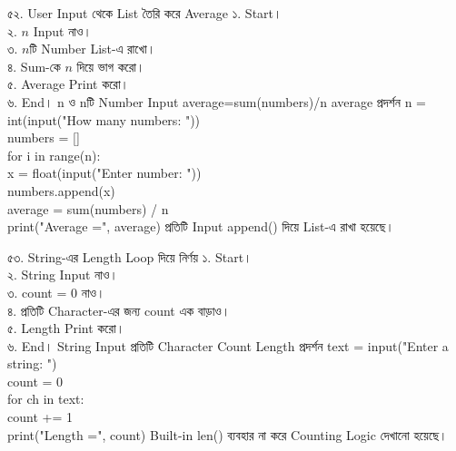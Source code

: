 
\exerciseTable
{৫২. User Input থেকে List তৈরি করে Average}
{
১. Start।\\
২. \(n\) Input নাও।\\
৩. \(n\)টি Number List-এ রাখো।\\
৪. Sum-কে \(n\) দিয়ে ভাগ করো।\\
৫. Average Print করো।\\
৬. End।
}
{
\linearflow
{n ও nটি Number Input}
{average=sum(numbers)/n}
{average প্রদর্শন}
}
{
n = int(input("How many numbers: "))\\
numbers = []\\
for i in range(n):\\
\hspace*{4mm}x = float(input("Enter number: "))\\
\hspace*{4mm}numbers.append(x)\\
average = sum(numbers) / n\\
print("Average =", average)
}
{
প্রতিটি Input
\textenglish{\ttfamily append()}
দিয়ে List-এ রাখা হয়েছে।
}


\exerciseTable
{৫৩. String-এর Length Loop দিয়ে নির্ণয়}
{
১. Start।\\
২. String Input নাও।\\
৩. count = 0 নাও।\\
৪. প্রতিটি Character-এর জন্য count এক বাড়াও।\\
৫. Length Print করো।\\
৬. End।
}
{
\linearflow
{String Input}
{প্রতিটি Character Count}
{Length প্রদর্শন}
}
{
text = input("Enter a string: ")\\
count = 0\\
for ch in text:\\
\hspace*{4mm}count += 1\\
print("Length =", count)
}
{
Built-in
\textenglish{\ttfamily len()}
ব্যবহার না করে Counting Logic দেখানো হয়েছে।
}



